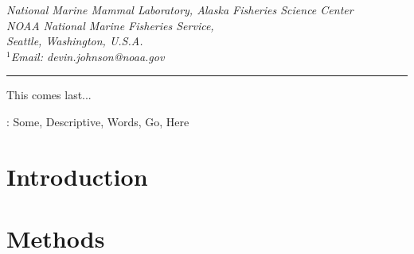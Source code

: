 \documentclass[fleqn]{article}
\begin{document}
\renewcommand{\baselinestretch}{1.5}\normalsize

\bigskip

\renewcommand{\baselinestretch}{1}\normalsize

\bigskip

{
\itshape{\noindent National Marine Mammal Laboratory, Alaska Fisheries Science Center\\
NOAA National Marine Fisheries Service,\\
Seattle, Washington, U.S.A.\medskip \\
$^1${\em Email:} devin.johnson@noaa.gov
}
\bigskip 
\hrule
\bigskip
}


\raggedbottom



This comes last...

: Some, Descriptive, Words, Go, Here\medskip



\renewcommand{\baselinestretch}{1.1}\normalsize
\linenumbers

\section{Introduction}


\section{Methods}
\end{document}
